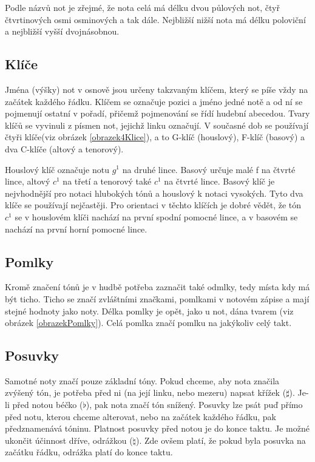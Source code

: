 Podle názvů not je zřejmé, že nota celá má délku dvou půlových not, 
čtyř čtvrtinových osmi osminových a tak dále.
Nejbližší nižší nota má délku poloviční a nejbližší vyšší dvojnásobnou.
\par

\subsection*{Klíče}
Jména (výšky) not v osnově jsou určeny takzvaným klíčem, 
který se píše vždy na začátek každého řádku.
Klíčem se označuje pozici a jméno jedné notě a od ní se pojmenují ostatní v pořadí, 
přičemž pojmenování se řídí hudební abecedou.
Tvary klíčů se vyvinuli z písmen not, jejichž linku označují.
V současné dob se používají čtyři klíče(viz obrázek \ref{obrazek4Klice}), 
a to G-klíč (houslový), F-klíč (basový) a dva C-klíče (altový a tenorový).


Houslový klíč označuje notu $g^1$ na druhé lince.
Basový určuje malé f na čtvrté lince, altový $c^1$ na třetí a tenorový také $c^1$ na čtvrté lince.
Basový klíč je nejvhodnější pro notaci hlubokých tónů a houslový k notaci vysokých.
Tyto dva klíče se používají nejčastěji. 
Pro orientaci v těchto klíčích je dobré vědět, že
tón $c^1$ se v houslovém klíči nachází na první spodní pomocné lince, 
a v basovém se nachází na první horní pomocné lince.
\cite{cmiral,zenkl}
\par

\subsection*{Pomlky}
Kromě značení tónů je v hudbě potřeba zaznačit také odmlky, tedy místa kdy má být ticho.
Ticho se značí zvláštními značkami, pomlkami v notovém zápise a mají stejné hodnoty jako noty.
Délka pomlky je opět, jako u not, dána tvarem (viz obrázek \ref{obrazekPomlky}).
Celá pomlka značí pomlku na jakýkoliv celý takt.
\cite{cmiral,zenkl}


\subsection*{Posuvky}
Samotné noty značí pouze základní tóny.
Pokud chceme, aby nota značila zvýšený tón, je potřeba před ni (na její linku, nebo mezeru) napsat křížek ($\sharp $).
Je-li před notou béčko ($\flat $), pak nota značí tón snížený.
Posuvky lze psát puď přímo před notu, kterou chceme alterovat, nebo na začátek každého řádku, pak předznamenává tóninu.
Platnost posuvky před notou je do konce taktu.
Je možné ukončit účinnost dříve, odrážkou ($\natural $).
Zde ovšem platí, že pokud byla posuvka na začátku řádku, odrážka platí do konce taktu.
\cite{cmiral,zenkl}

